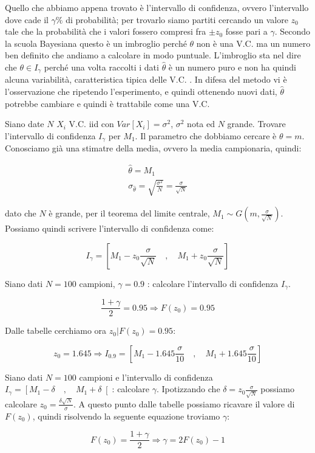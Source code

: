 Quello che abbiamo appena trovato è l'intervallo di confidenza, ovvero l'intervallo dove cade il $\gamma\%$ di probabilità; per trovarlo siamo partiti cercando un valore $z_0$ tale che la probabilità che i valori fossero compresi fra $\pm z_0$ fosse pari a $\gamma$.\newline
Secondo la scuola Bayesiana questo è un imbroglio perché $\theta$ non è una V.C. ma un numero ben definito che andiamo a calcolare in modo puntuale. L'imbroglio sta nel dire che $\theta \in I_\gamma$ perché una volta raccolti i dati $\hat{\theta}$ è un numero puro e non ha quindi alcuna variabilità, caratteristica tipica delle V.C. . In difesa del metodo vi è l'osservazione che ripetendo l'esperimento, e quindi ottenendo nuovi dati, $\hat{\theta}$ potrebbe cambiare e quindi è trattabile come una V.C.


\begin{esempio} %
Siano date $N$ $X_i$ V.C. iid con $Var[X_i]=\sigma^2$, $\sigma^2$ nota ed $N$ grande. Trovare l'intervallo di confidenza $I_\gamma$ per $M_1$.\newline
Il parametro che dobbiamo cercare è $\theta=m$. Conosciamo già una stimatre della media, ovvero la media campionaria, quindi:
 
 \begin{gather*}
    \hat{\theta}=M_1 \\
    \sigma_{\hat{\theta}}=\sqrt{\frac{\sigma^2}{N}}=\frac{\sigma}{\sqrt{N}}
 \end{gather*}
 
dato che $N$ è grande, per il teorema del limite centrale, $M_1 \sim G(m,\frac{\sigma}{\sqrt{N}})$. Possiamo quindi scrivere l'intervallo di confidenza come:

  \[ I_\gamma = \left[ M_1-z_0\frac{\sigma}{\sqrt{N}} \quad ,\quad M_1+z_0\frac{\sigma}{\sqrt{N}} \right]  \]
\end{esempio}
\begin{esempio} %
Siano dati $N=100$ campioni, $\gamma=0.9$ : calcolare l'intervallo di confidenza $I_\gamma$.

  \[ \frac{1+\gamma}{2}=0.95 \Longrightarrow F(z_0)=0.95 \]
  
Dalle tabelle cerchiamo ora $z_0 | F(z_0)=0.95$:

  \[ z_0=1.645 \Longrightarrow I_{0.9}=\left[ M_1-1.645\frac{\sigma}{10} \quad ,\quad M_1+1.645\frac{\sigma}{10} \right]  \]
\end{esempio}
\begin{esempio} %
Siano dati $N=100$ campioni e l'intervallo di confidenza $I_\gamma=\left[ M_1-\delta \quad ,\quad M_1+\delta \right[ $: calcolare $\gamma$.\newline
Ipotizzando che $\delta=z_0\frac{\sigma}{\sqrt{N}}$ possiamo calcolare $z_0=\frac{\delta\sqrt{N}}{\sigma}$. A questo punto dalle tabelle possiamo ricavare il valore di $F(z_0)$, quindi risolvendo la seguente equazione troviamo $\gamma$:

  \[ F(z_0)=\frac{1+\gamma}{2} \Longrightarrow \gamma= 2F(z_0)-1 \]
\end{esempio}
